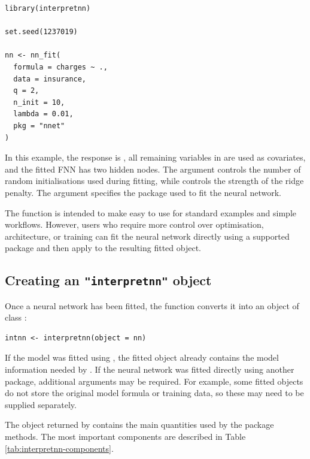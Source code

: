 \begin{verbatim}
library(interpretnn)

set.seed(1237019)

nn <- nn_fit(
  formula = charges ~ .,
  data = insurance,
  q = 2,
  n_init = 10,
  lambda = 0.01,
  pkg = "nnet"
)
\end{verbatim}

In this example, the response is , all remaining variables in  are used as covariates, and the fitted FNN has two hidden nodes.
The argument  controls the number of random initialisations used during fitting, while  controls the strength of the ridge penalty.
The argument  specifies the package used to fit the neural network.

The  function is intended to make  easy to use for standard examples and simple workflows.
However, users who require more control over optimisation, architecture, or training can fit the neural network directly using a supported package and then apply  to the resulting fitted object.

\subsection{\texorpdfstring{Creating an \texttt{"interpretnn"} object}{Creating an "interpretnn" object}}\label{creating-an-interpretnn-object}

Once a neural network has been fitted, the  function converts it into an object of class :

\begin{verbatim}
intnn <- interpretnn(object = nn)
\end{verbatim}

If the model was fitted using , the fitted object already contains the model information needed by .
If the neural network was fitted directly using another package, additional arguments may be required.
For example, some fitted objects do not store the original model formula or training data, so these may need to be supplied separately.

The object returned by  contains the main quantities used by the package methods.
The most important components are described in Table \ref{tab:interpretnn-components}.

